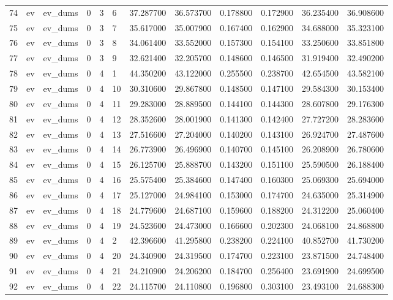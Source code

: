 \begin{tabular}{llllllrrrrrr}
74 & ev & ev_dums & 0 & 3 & 6 & 37.287700 & 36.573700 & 0.178800 & 0.172900 & 36.235400 & 36.908600 \\
75 & ev & ev_dums & 0 & 3 & 7 & 35.617000 & 35.007900 & 0.167400 & 0.162900 & 34.688000 & 35.323100 \\
76 & ev & ev_dums & 0 & 3 & 8 & 34.061400 & 33.552000 & 0.157300 & 0.154100 & 33.250600 & 33.851800 \\
77 & ev & ev_dums & 0 & 3 & 9 & 32.621400 & 32.205700 & 0.148600 & 0.146500 & 31.919400 & 32.490200 \\
78 & ev & ev_dums & 0 & 4 & 1 & 44.350200 & 43.122000 & 0.255500 & 0.238700 & 42.654500 & 43.582100 \\
79 & ev & ev_dums & 0 & 4 & 10 & 30.310600 & 29.867800 & 0.148500 & 0.147100 & 29.584300 & 30.153400 \\
80 & ev & ev_dums & 0 & 4 & 11 & 29.283000 & 28.889500 & 0.144100 & 0.144300 & 28.607800 & 29.176300 \\
81 & ev & ev_dums & 0 & 4 & 12 & 28.352600 & 28.001900 & 0.141300 & 0.142400 & 27.727200 & 28.283600 \\
82 & ev & ev_dums & 0 & 4 & 13 & 27.516600 & 27.204000 & 0.140200 & 0.143100 & 26.924700 & 27.487600 \\
83 & ev & ev_dums & 0 & 4 & 14 & 26.773900 & 26.496900 & 0.140700 & 0.145100 & 26.208900 & 26.780600 \\
84 & ev & ev_dums & 0 & 4 & 15 & 26.125700 & 25.888700 & 0.143200 & 0.151100 & 25.590500 & 26.188400 \\
85 & ev & ev_dums & 0 & 4 & 16 & 25.575400 & 25.384600 & 0.147400 & 0.160300 & 25.069300 & 25.694000 \\
86 & ev & ev_dums & 0 & 4 & 17 & 25.127000 & 24.984100 & 0.153000 & 0.174700 & 24.635000 & 25.314900 \\
87 & ev & ev_dums & 0 & 4 & 18 & 24.779600 & 24.687100 & 0.159600 & 0.188200 & 24.312200 & 25.060400 \\
88 & ev & ev_dums & 0 & 4 & 19 & 24.523600 & 24.473000 & 0.166600 & 0.202300 & 24.068100 & 24.868800 \\
89 & ev & ev_dums & 0 & 4 & 2 & 42.396600 & 41.295800 & 0.238200 & 0.224100 & 40.852700 & 41.730200 \\
90 & ev & ev_dums & 0 & 4 & 20 & 24.340900 & 24.319500 & 0.174700 & 0.223100 & 23.871500 & 24.748400 \\
91 & ev & ev_dums & 0 & 4 & 21 & 24.210900 & 24.206200 & 0.184700 & 0.256400 & 23.691900 & 24.699500 \\
92 & ev & ev_dums & 0 & 4 & 22 & 24.115700 & 24.110800 & 0.196800 & 0.303100 & 23.493100 & 24.688300 \\

\end{tabular}
